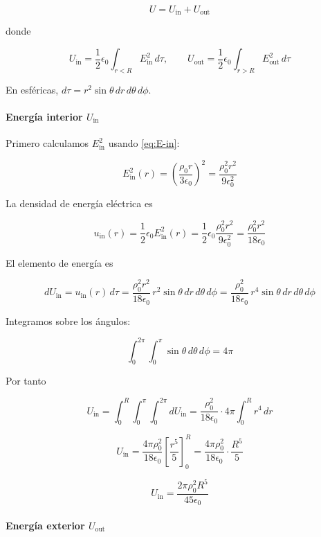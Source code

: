 \documentclass{article}
\begin{document}
\[
U = U_{\text{in}} + U_{\text{out}}
\]

donde

\[
U_{\text{in}} = \frac{1}{2}\epsilon_{0}\int_{r<R} E_{\text{in}}^{2}\,d\tau,
\qquad
U_{\text{out}} = \frac{1}{2}\epsilon_{0}\int_{r>R} E_{\text{out}}^{2}\,d\tau
\]

En esféricas, $d\tau = r^{2}\sin\theta\,dr\,d\theta\,d\phi$.

\paragraph{Energía interior $U_{\text{in}}$}

Primero calculamos $E_{\text{in}}^{2}$ usando \eqref{eq:E-in}:

\[
E_{\text{in}}^{2}(r) = \left(\frac{\rho_{0}r}{3\epsilon_{0}}\right)^{2}
= \frac{\rho_{0}^{2}r^{2}}{9\epsilon_{0}^{2}}
\]

La densidad de energía eléctrica es

\[
u_{\text{in}}(r) = \frac{1}{2}\epsilon_{0}E_{\text{in}}^{2}(r)
= \frac{1}{2}\epsilon_{0}\frac{\rho_{0}^{2}r^{2}}{9\epsilon_{0}^{2}}
= \frac{\rho_{0}^{2}r^{2}}{18\epsilon_{0}}
\]

El elemento de energía es

\[
dU_{\text{in}} = u_{\text{in}}(r)\,d\tau
= \frac{\rho_{0}^{2}r^{2}}{18\epsilon_{0}}\,
  r^{2}\sin\theta\,dr\,d\theta\,d\phi
= \frac{\rho_{0}^{2}}{18\epsilon_{0}}\,r^{4}\sin\theta\,dr\,d\theta\,d\phi
\]

Integramos sobre los ángulos:

\[
\int_{0}^{2\pi}\!\!\int_{0}^{\pi}\sin\theta\,d\theta\,d\phi = 4\pi
\]

Por tanto

\[
U_{\text{in}} = \int_{0}^{R}\!\!\int_{0}^{\pi}\!\!\int_{0}^{2\pi} dU_{\text{in}}
= \frac{\rho_{0}^{2}}{18\epsilon_{0}} \cdot 4\pi
  \int_{0}^{R} r^{4}\,dr
\]

\[
U_{\text{in}} = \frac{4\pi\rho_{0}^{2}}{18\epsilon_{0}}
\left[\frac{r^{5}}{5}\right]_{0}^{R}
= \frac{4\pi\rho_{0}^{2}}{18\epsilon_{0}}\cdot\frac{R^{5}}{5}
\]

\begin{equation}
U_{\text{in}} = \frac{2\pi\rho_{0}^{2}R^{5}}{45\epsilon_{0}}
\label{eq:U-in-rho}
\end{equation}

\paragraph{Energía exterior $U_{\text{out}}$}
\end{document}
